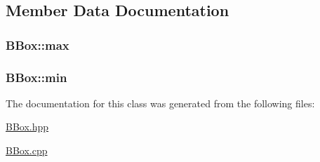\subsection{Member Data Documentation}
\hypertarget{classBBox_a2eb4d802aaaf2e65c7a03faa91855081}{
\subsubsection[{max}]{ B\+Box\+::max}}\label{classBBox_a2eb4d802aaaf2e65c7a03faa91855081}
\hypertarget{classBBox_ab65bac30fa278acb493ac63631ad83e3}{
\subsubsection[{min}]{ B\+Box\+::min}}\label{classBBox_ab65bac30fa278acb493ac63631ad83e3}


The documentation for this class was generated from the following files\+:\begin{DoxyCompactItemize}
\item 
\hyperlink{BBox_8hpp}{B\+Box.\+hpp}\item 
\hyperlink{BBox_8cpp}{B\+Box.\+cpp}\end{DoxyCompactItemize}
